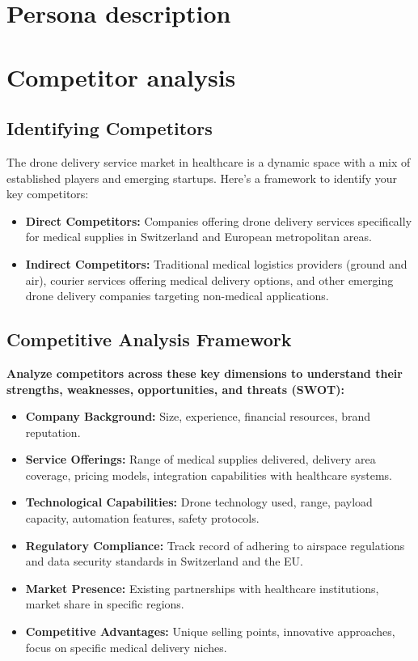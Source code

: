 \section{Persona description}
\section{Competitor analysis}
\subsection{Identifying Competitors}
The drone delivery service market in healthcare is a dynamic space with a mix of established players and emerging startups. Here's a framework to identify your key competitors:
\begin{itemize}
  \item \textbf{Direct Competitors:} Companies offering drone delivery services specifically for medical supplies in Switzerland and European metropolitan areas.
  \item \textbf{Indirect Competitors:} Traditional medical logistics providers (ground and air), courier services offering medical delivery options, and other emerging drone delivery companies targeting non-medical applications.
\end{itemize}

\subsection{Competitive Analysis Framework}
\textbf{Analyze competitors across these key dimensions to understand their strengths, weaknesses, opportunities, and threats (SWOT):}
\begin{itemize}
  \item \textbf{Company Background:} Size, experience, financial resources, brand reputation.
  \item \textbf{Service Offerings:} Range of medical supplies delivered, delivery area coverage, pricing models, integration capabilities with healthcare systems.
  \item \textbf{Technological Capabilities:} Drone technology used, range, payload capacity, automation features, safety protocols.
  \item \textbf{Regulatory Compliance:} Track record of adhering to airspace regulations and data security standards in Switzerland and the EU.
  \item \textbf{Market Presence:} Existing partnerships with healthcare institutions, market share in specific regions.
  \item \textbf{Competitive Advantages:} Unique selling points, innovative approaches, focus on specific medical delivery niches.
\end{itemize}
